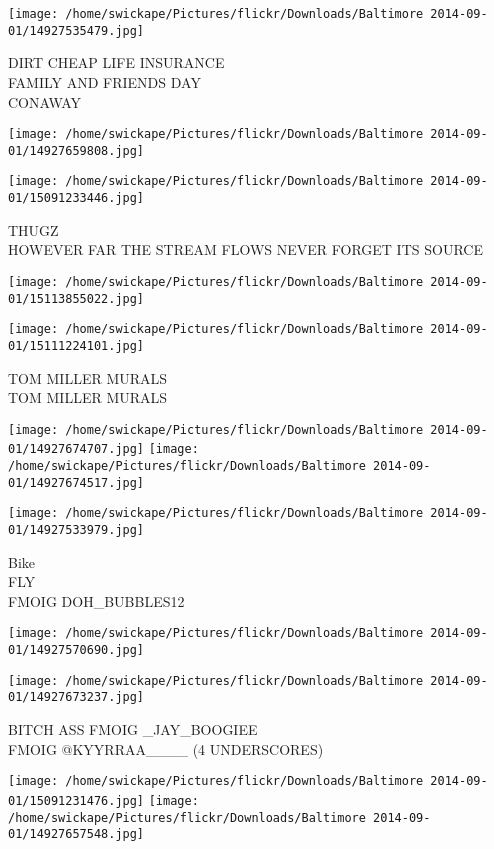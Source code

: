 \documentclass[10pt,letterpaper]{article}
\begin{document}
\texttt{[image: /home/swickape/Pictures/flickr/Downloads/Baltimore 2014-09-01/14927535479.jpg]}

DIRT CHEAP LIFE INSURANCE\\
FAMILY AND FRIENDS DAY\\
CONAWAY
\pagebreak

\texttt{[image: /home/swickape/Pictures/flickr/Downloads/Baltimore 2014-09-01/14927659808.jpg]}

\vspace{0.25in}
\texttt{[image: /home/swickape/Pictures/flickr/Downloads/Baltimore 2014-09-01/15091233446.jpg]}

THUGZ\\
HOWEVER FAR THE STREAM FLOWS NEVER FORGET ITS SOURCE
\pagebreak

\texttt{[image: /home/swickape/Pictures/flickr/Downloads/Baltimore 2014-09-01/15113855022.jpg]}

\vspace{0.25in}
\texttt{[image: /home/swickape/Pictures/flickr/Downloads/Baltimore 2014-09-01/15111224101.jpg]}

TOM MILLER MURALS\\
TOM MILLER MURALS
\pagebreak

\texttt{[image: /home/swickape/Pictures/flickr/Downloads/Baltimore 2014-09-01/14927674707.jpg]}
\texttt{[image: /home/swickape/Pictures/flickr/Downloads/Baltimore 2014-09-01/14927674517.jpg]}

\vspace{0.25in}
\texttt{[image: /home/swickape/Pictures/flickr/Downloads/Baltimore 2014-09-01/14927533979.jpg]}

Bike\\
FLY\\
FMOIG DOH\_BUBBLES12
\pagebreak

\texttt{[image: /home/swickape/Pictures/flickr/Downloads/Baltimore 2014-09-01/14927570690.jpg]}

\vspace{0.25in}
\texttt{[image: /home/swickape/Pictures/flickr/Downloads/Baltimore 2014-09-01/14927673237.jpg]}

BITCH ASS FMOIG \_JAY\_BOOGIEE\\
FMOIG @KYYRRAA\_\_\_\_ (4 UNDERSCORES)
\pagebreak

\texttt{[image: /home/swickape/Pictures/flickr/Downloads/Baltimore 2014-09-01/15091231476.jpg]}
\texttt{[image: /home/swickape/Pictures/flickr/Downloads/Baltimore 2014-09-01/14927657548.jpg]}
\end{document}
